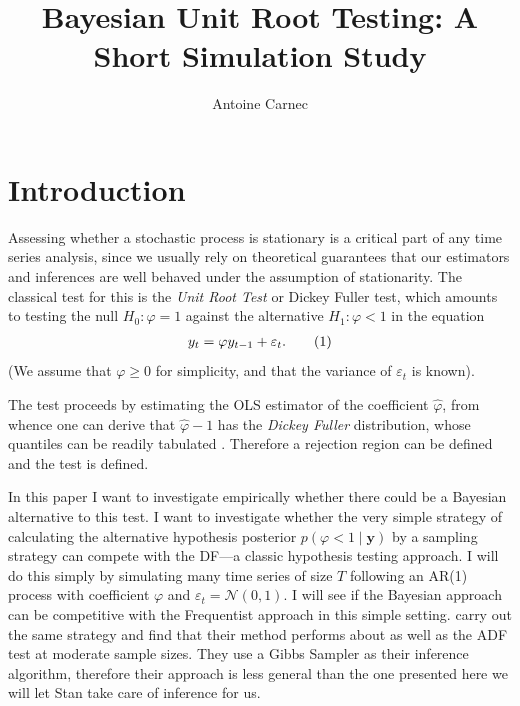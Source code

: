 \documentclass{article}
\title{Bayesian Unit Root Testing: A Short Simulation Study}
\author{Antoine Carnec}
\date{}
\theoremstyle{definition}
\theoremstyle{exercise}
\theoremstyle{remark}
\newcommand\nt{\addtocounter{equation}{1}\tag{\theequation}}
\begin{document}
\maketitle
\noindent


\section*{Introduction}

Assessing whether a stochastic process is stationary is a critical part of any time series analysis, since we usually rely on theoretical guarantees that our estimators and inferences are well behaved under the assumption of stationarity.
The classical test for this is the \emph{Unit Root Test} or Dickey Fuller test, which amounts to testing the null $H_0: \varphi = 1$ against the alternative $H_1: \varphi < 1$ in the equation
\begin{align*}
y_t = \varphi y_{t-1} + \varepsilon_{t}. \nt \label{eq:DF}
\end{align*}
(We assume that $\varphi \geq 0$ for simplicity, and that the variance of $\varepsilon_{t}$ is known).


The test proceeds by estimating the OLS estimator of the coefficient $\hat{\varphi}$, from whence one can derive that
\(
    \hat{\varphi} - 1
\)
has the \emph{Dickey Fuller} distribution, whose quantiles can be readily tabulated \citep{tsay2005analysis}. Therefore a rejection region can be defined and the test is defined.

In this paper I want to investigate empirically whether there could be a Bayesian alternative to this test.
I want to investigate whether the very simple strategy of calculating the alternative hypothesis posterior $p(\varphi < 1 \;|\; \mathbf{y})$ by a sampling strategy can compete with the DF---a classic hypothesis testing approach.
I will do this simply by simulating many time series of size $T$ following an AR(1) process with coefficient $\varphi$ and $\varepsilon_{t} = \mathcal{N}(0, 1)$.
I will see if the Bayesian approach can be competitive with the Frequentist approach in this simple setting.
\cite{so1999bayesian} carry out the same strategy and find that their method performs about as well as the ADF test at moderate sample sizes. They use a Gibbs Sampler as their inference algorithm, therefore their approach is less general than the one presented here we will let Stan take care of inference for us.
\end{document}
